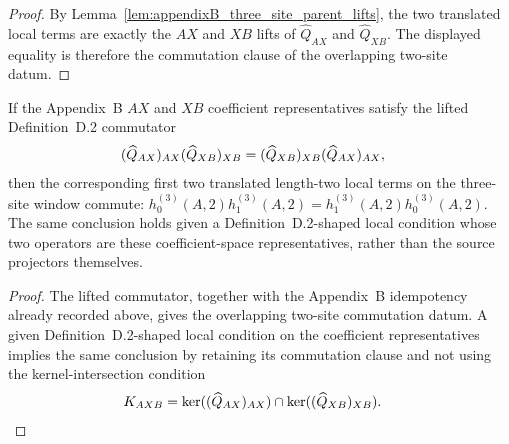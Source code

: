 \begin{proof}
    \leanok
    By Lemma~\ref{lem:appendixB_three_site_parent_lifts}, the two translated
    local terms are exactly the $AX$ and $XB$ lifts of
    $\widehat Q_{AX}$ and $\widehat Q_{XB}$. The displayed equality is
    therefore the commutation clause of the overlapping two-site datum.
\end{proof}

\begin{lemma}
    \label{lem:appendixB_lift_commutator_parent_terms}
    \leanok
    If the Appendix~B $AX$ and $XB$ coefficient representatives satisfy the
    lifted Definition~D.2 commutator
    \begin{align}
        (\widehat Q_{AX})_{AX}(\widehat Q_{XB})_{XB}
         & =
        (\widehat Q_{XB})_{XB}(\widehat Q_{AX})_{AX},
        \notag
    \end{align}
    then the corresponding first two translated length-two local terms on the
    three-site window commute:
    $h_0^{(3)}(A,2)h_1^{(3)}(A,2) = h_1^{(3)}(A,2)h_0^{(3)}(A,2)$.
    The same conclusion holds given a Definition~D.2-shaped local
    condition whose two operators are these coefficient-space representatives,
    rather than the source projectors themselves.
\end{lemma}

\begin{proof}
    \leanok
    The lifted commutator, together with the Appendix~B idempotency already
    recorded above, gives the overlapping two-site commutation datum. A given
    Definition~D.2-shaped local condition on the coefficient representatives
    implies the same conclusion by retaining its commutation clause and not using
    the kernel-intersection condition
    \begin{align}
        K_{AXB}
         & =
        \ker((\widehat Q_{AX})_{AX})
        \cap
        \ker((\widehat Q_{XB})_{XB}).
        \notag
    \end{align}
\end{proof}
